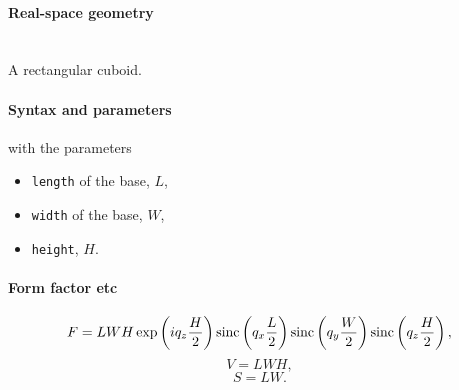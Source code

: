 \paragraph{Real-space geometry}\strut\\
A rectangular cuboid.

\begin{figure}[h]
\hfill
{}
\hfill
{}
\hfill
{}
\hfill
\end{figure}

\FloatBarrier

\paragraph{Syntax and parameters}
\begin{quote}
\end{quote}
with the parameters
\begin{itemize}
\item \texttt{length} of the base, $L$,
\item \texttt{width} of the base, $W$,
\item \texttt{height}, $H$.
\end{itemize}


\paragraph{Form factor etc}

\begin{equation*}
F= L W H\exp\left(i q_z \frac{H}{2}\right) \operatorname{sinc}\left(q_x \frac{L}{2}\right)
\operatorname{sinc}\left(q_y \frac{W}{2}\right) \operatorname{sinc}\left(q_z \frac{H}{2}\right),
\end{equation*}
\begin{equation*}
  V= LWH,
\end{equation*}
\begin{equation*}
  S = LW.
\end{equation*}

